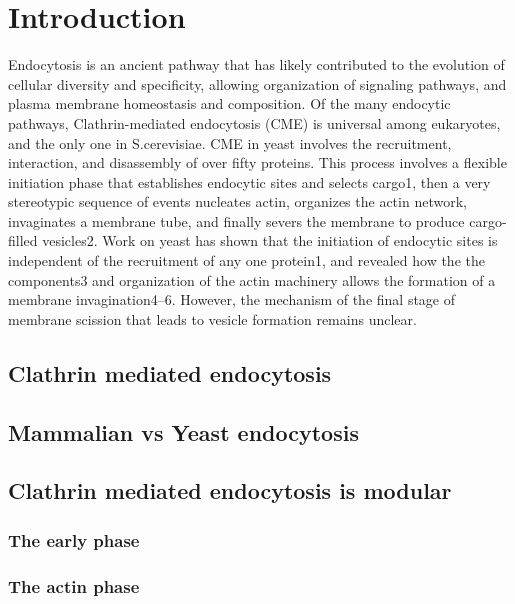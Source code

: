 \chapter{Introduction} %

\label{Ch:Aims} %

Endocytosis is an ancient pathway that has likely contributed to the evolution of cellular diversity and specificity, allowing organization of signaling pathways, and plasma membrane homeostasis and composition. Of the many endocytic pathways, Clathrin-mediated endocytosis (CME) is universal among eukaryotes, and the only one in S.cerevisiae. CME in yeast involves the recruitment, interaction, and disassembly of over fifty proteins. This process involves a flexible initiation phase that establishes endocytic sites and selects cargo1, then a very stereotypic sequence of events nucleates actin, organizes the actin network, invaginates a membrane tube, and finally severs the membrane to produce cargo-filled vesicles2. Work on yeast has shown that the initiation of endocytic sites is independent of the recruitment of any one protein1, and revealed how the the components3 and organization of the actin machinery allows the formation of a membrane invagination4–6. However, the mechanism of the final stage of membrane scission that leads to vesicle formation remains unclear.


	\section{Clathrin mediated endocytosis}
	
	\section{Mammalian vs Yeast endocytosis}
	
	
	\section{Clathrin mediated endocytosis is modular}
		\subsection{The early phase}
		\subsection{The actin phase}
